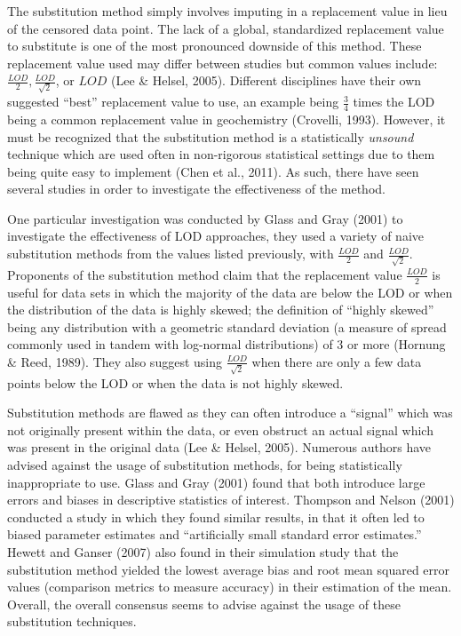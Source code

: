 \documentclass[12pt, twoside]{amherstthesis}
\begin{document}
The substitution method simply involves imputing in a replacement value in lieu of the censored data point. The lack of a global, standardized replacement value to substitute is one of the most pronounced downside of this method. These replacement value used may differ between studies but common values include: \(\frac{LOD}{2}, \frac{LOD}{\sqrt2}\), or \(LOD\) (Lee \& Helsel, 2005). Different disciplines have their own suggested ``best'' replacement value to use, an example being \(\frac{3}{4}\) times the LOD being a common replacement value in geochemistry (Crovelli, 1993). However, it must be recognized that the substitution method is a statistically \emph{unsound} technique which are used often in non-rigorous statistical settings due to them being quite easy to implement (Chen et al., 2011). As such, there have seen several studies in order to investigate the effectiveness of the method.

One particular investigation was conducted by Glass and Gray (2001) to investigate the effectiveness of LOD approaches, they used a variety of naive substitution methods from the values listed previously, with \(\frac{LOD}{2}\) and \(\frac{LOD}{\sqrt2}\). Proponents of the substitution method claim that the replacement value \(\frac{LOD}{2}\) is useful for data sets in which the majority of the data are below the LOD or when the distribution of the data is highly skewed; the definition of ``highly skewed'' being any distribution with a geometric standard deviation (a measure of spread commonly used in tandem with log-normal distributions) of 3 or more (Hornung \& Reed, 1989). They also suggest using \(\frac{LOD}{\sqrt2}\) when there are only a few data points below the LOD or when the data is not highly skewed.

Substitution methods are flawed as they can often introduce a ``signal'' which was not originally present within the data, or even obstruct an actual signal which was present in the original data (Lee \& Helsel, 2005). Numerous authors have advised against the usage of substitution methods, for being statistically inappropriate to use. Glass and Gray (2001) found that both introduce large errors and biases in descriptive statistics of interest. Thompson and Nelson (2001) conducted a study in which they found similar results, in that it often led to biased parameter estimates and ``artificially small standard error estimates.'' Hewett and Ganser (2007) also found in their simulation study that the substitution method yielded the lowest average bias and root mean squared error values (comparison metrics to measure accuracy) in their estimation of the mean. Overall, the overall consensus seems to advise against the usage of these substitution techniques.
\end{document}
